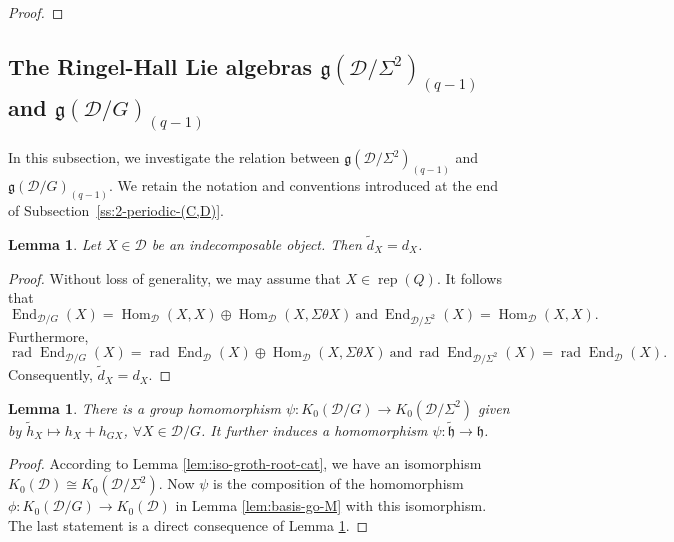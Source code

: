 \documentclass[12pt,reqno]{amsart}
\numberwithin{equation}{section}
\newcommand{\rad}{\operatorname{rad}\nolimits}
\newcommand{\End}{\operatorname{End}\nolimits}
\newcommand{\rep}{\operatorname{rep}\nolimits}
\newcommand{\Hom}{\operatorname{Hom}\nolimits}
\newcommand{\go}{{K_0}}
\newtheorem{lemma}[theorem]{Lemma}
\begin{document}
\begin{proof}
	\end{proof}
	
	\subsection{The Ringel-Hall Lie algebras $\mathfrak{g}(\mathcal{D}/\Sigma^2)_{(q-1)}$ and $\mathfrak{g}(\mathcal{D}/G)_{(q-1)}$}
	
	In this subsection, we investigate the relation between
	$\mathfrak{g}(\mathcal{D}/\Sigma^2)_{(q-1)}$ and
	$\mathfrak{g}(\mathcal{D}/G)_{(q-1)}$. We retain the notation and
	conventions introduced at the end of
	Subsection~\ref{ss:2-periodic-(C,D)}.
	
	\begin{lemma}\label{lem:tilde-d=d}
		Let $X\in \mathcal{D}$ be an indecomposable object. Then $\tilde{d}_X=d_X$.
	\end{lemma}
	\begin{proof}
		Without loss of generality, we may assume that $X\in \rep(Q)$. It follows that \[\End_{\mathcal{D}/G}(X)=\Hom_{\mathcal{D}}(X,X)\oplus \Hom_{\mathcal{D}}(X,\Sigma \theta X) \ \text{and}\ \End_{\mathcal{D}/\Sigma^2}(X)=\Hom_{\mathcal{D}}(X,X).\] Furthermore, \[\rad \End_{\mathcal{D}/G}(X)=\rad \End_{\mathcal{D}}(X)\oplus \Hom_{\mathcal{D}}(X,\Sigma \theta X)\ \text{and}\ \rad \End_{\mathcal{D}/\Sigma^2}(X)=\rad \End_{\mathcal{D}}(X).\] Consequently, $\tilde{d}_X=d_X$.
	\end{proof}
	\begin{lemma}\label{lem:homom-cartan-subalgebra}
		There is  a group homomorphism $\psi:\go(\mathcal{D}/G)\rightarrow \go(\mathcal{D}/\Sigma^2)$ given by
		$\tilde{h}_X\mapsto h_X+h_{GX}$, $\forall X\in \mathcal{D}/G$. It further induces a homomorphism $\psi:\tilde{\mathfrak{h}}\rightarrow \mathfrak{h}$.
	\end{lemma}
	\begin{proof}
		According to Lemma \ref{lem:iso-groth-root-cat}, we have an isomorphism
		$\go(\mathcal{D})\cong \go(\mathcal{D}/\Sigma^2)$. Now $\psi$ is the composition of the homomorphism $\phi:\go(\mathcal{D}/G)\rightarrow \go(\mathcal{D})$ in Lemma \ref{lem:basis-go-M} with this isomorphism. The last statement is a direct consequence of Lemma \ref{lem:tilde-d=d}.
	\end{proof}
	
\end{document}
